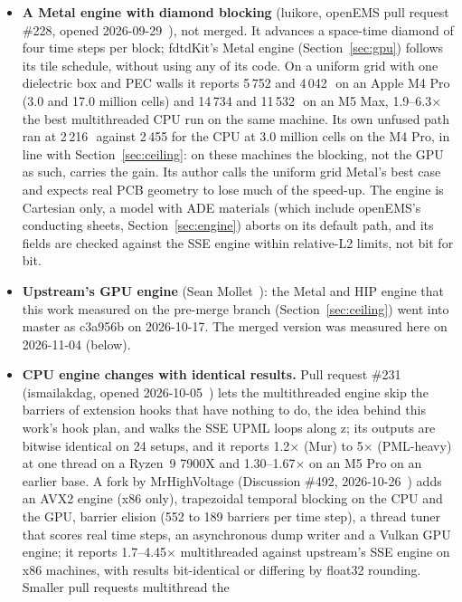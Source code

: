 \begin{itemize}
\item \textbf{A Metal engine with diamond blocking} (luikore, openEMS pull request \#228, opened
  2026-09-29~\cite{luikore228}), not merged. It advances a space-time diamond of four time steps per block; fdtdKit's
  Metal engine (Section~\ref{sec:gpu}) follows its tile schedule, without using any of its code. On a uniform grid
  with one dielectric box and PEC walls it reports 5\,752 and 4\,042\,\MC\ on an Apple M4 Pro (3.0 and 17.0 million
  cells) and 14\,734 and 11\,532\,\MC\ on an M5 Max, 1.9--6.3$\times$ the best multithreaded CPU run on the same
  machine. Its own unfused path ran at 2\,216\,\MC\ against 2\,455 for the CPU at 3.0 million cells on the M4 Pro, in
  line with Section~\ref{sec:ceiling}: on these machines the blocking, not the GPU as such, carries the gain. Its
  author calls the uniform grid Metal's best case and expects real PCB geometry to lose much of the speed-up. The
  engine is Cartesian only, a model with ADE materials (which include openEMS's conducting sheets,
  Section~\ref{sec:engine}) aborts on its default path, and its fields are checked against the SSE engine within
  relative-L2 limits, not bit for bit.
\item \textbf{Upstream's GPU engine} (Sean Mollet~\cite{mollet235}): the Metal and HIP engine that this work measured
  on the pre-merge branch (Section~\ref{sec:ceiling}) went into master as c3a956b on 2026-10-17. The merged version
  was measured here on 2026-11-04 (below).
\item \textbf{CPU engine changes with identical results.} Pull request \#231 (ismailakdag, opened
  2026-10-05~\cite{akdag231}) lets the multithreaded engine skip the barriers of extension hooks that have nothing to
  do, the idea behind this work's hook plan, and walks the SSE UPML loops along z; its outputs are bitwise identical
  on 24 setups, and it reports 1.2$\times$ (Mur) to 5$\times$ (PML-heavy) at one thread on a Ryzen~9 7900X and
  1.30--1.67$\times$ on an M5 Pro on an earlier base. A fork by MrHighVoltage (Discussion \#492,
  2026-10-26~\cite{mrhv492}) adds an AVX2 engine (x86 only), trapezoidal temporal blocking on the CPU and the GPU,
  barrier elision (552 to 189 barriers per time step), a thread tuner that scores real time steps, an asynchronous
  dump writer and a Vulkan GPU engine; it reports 1.7--4.45$\times$ multithreaded against upstream's SSE engine on
  x86 machines, with results bit-identical or differing by float32 rounding. Smaller pull requests multithread the

\end{itemize}
